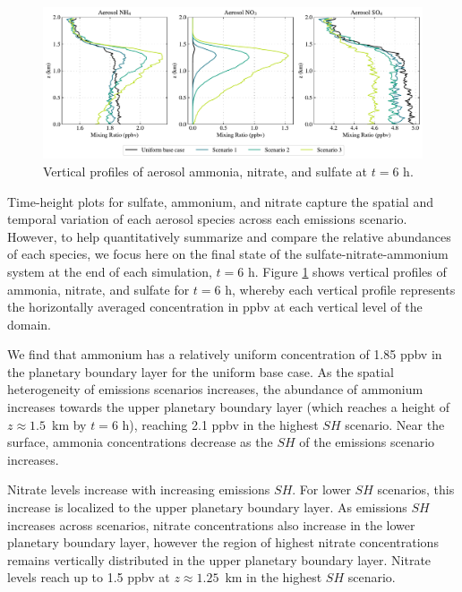 
\begin{figure}[!t]
  \centering
    \includegraphics[width=\textwidth]{figures/chapter5/aerosol-SNA-vertical-profiles-time36.pdf}
    \caption{Vertical profiles of aerosol ammonia, nitrate, and sulfate at $t=6$ h.}
    \label{fig:sna-vertical-profile}
\end{figure}

Time-height plots for sulfate, ammonium, and nitrate capture the spatial and temporal variation of each aerosol species across each emissions scenario. However, to help quantitatively summarize and compare the relative abundances of each species, we focus here on the final state of the sulfate-nitrate-ammonium system at the end of each simulation, $t=6$ h. Figure \ref{fig:sna-vertical-profile} shows vertical profiles of ammonia, nitrate, and sulfate for $t=6$ h, whereby each vertical profile represents the horizontally averaged concentration in ppbv at each vertical level of the domain.

We find that ammonium has a relatively uniform concentration of 1.85 ppbv in the planetary boundary layer for the uniform base case. As the spatial heterogeneity of emissions scenarios increases, the abundance of ammonium increases towards the upper planetary boundary layer (which reaches a height of $z\approx1.5$~km by $t=6$ h), reaching 2.1 ppbv in the highest $SH$ scenario. Near the surface, ammonia concentrations decrease as the $SH$ of the emissions scenario increases. 

Nitrate levels increase with increasing emissions $SH$. For lower $SH$ scenarios, this increase is localized to the upper planetary boundary layer. As emissions $SH$ increases across scenarios, nitrate concentrations also increase in the lower planetary boundary layer, however the region of highest nitrate concentrations remains vertically distributed in the upper planetary boundary layer. Nitrate levels reach up to 1.5 ppbv at $z\approx1.25$~km in the highest $SH$ scenario.  

